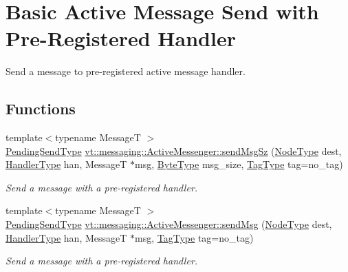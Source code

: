 \hypertarget{group__preregister}{}\section{Basic Active Message Send with Pre-\/\+Registered Handler}
\label{group__preregister}


Send a message to pre-\/registered active message handler.  


\subsection*{Functions}
\begin{DoxyCompactItemize}
\item 
{\footnotesize template$<$typename MessageT $>$ }\\\hyperlink{structvt_1_1messaging_1_1_active_messenger_a3626a6ca76d8ad4ec7c3b47a2c70d3a8}{Pending\+Send\+Type} \hyperlink{group__preregister_ga2476af8744705ddb66f92f616bfc5bb0}{vt\+::messaging\+::\+Active\+Messenger\+::send\+Msg\+Sz} (\hyperlink{namespacevt_a866da9d0efc19c0a1ce79e9e492f47e2}{Node\+Type} dest, \hyperlink{namespacevt_af64846b57dfcaf104da3ef6967917573}{Handler\+Type} han, MessageT $\ast$msg, \hyperlink{namespacevt_aab8d55968084610ce3b17057981e9300}{Byte\+Type} msg\+\_\+size, \hyperlink{namespacevt_a84ab281dae04a52a4b243d6bf62d0e52}{Tag\+Type} tag=no\+\_\+tag)
\begin{DoxyCompactList}\small\item\em Send a message with a pre-\/registered handler. \end{DoxyCompactList}\item 
{\footnotesize template$<$typename MessageT $>$ }\\\hyperlink{structvt_1_1messaging_1_1_active_messenger_a3626a6ca76d8ad4ec7c3b47a2c70d3a8}{Pending\+Send\+Type} \hyperlink{group__preregister_gaebfcd932babb3be0ea8d481f655a2835}{vt\+::messaging\+::\+Active\+Messenger\+::send\+Msg} (\hyperlink{namespacevt_a866da9d0efc19c0a1ce79e9e492f47e2}{Node\+Type} dest, \hyperlink{namespacevt_af64846b57dfcaf104da3ef6967917573}{Handler\+Type} han, MessageT $\ast$msg, \hyperlink{namespacevt_a84ab281dae04a52a4b243d6bf62d0e52}{Tag\+Type} tag=no\+\_\+tag)
\begin{DoxyCompactList}\small\item\em Send a message with a pre-\/registered handler. \end{DoxyCompactList}\item 

\end{DoxyCompactItemize}
